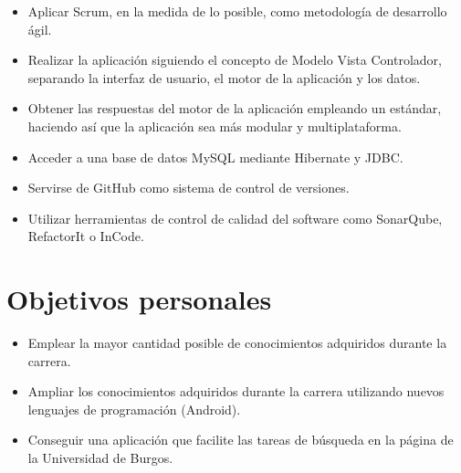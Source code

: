 \begin{itemize}
	\tightlist
	\item
	Aplicar Scrum, en la medida de lo posible, como metodología de desarrollo ágil.
	\item
	Realizar la aplicación siguiendo el concepto de Modelo Vista Controlador, separando la interfaz de usuario, el motor de la aplicación y los datos.
	\item
	Obtener las respuestas del motor de la aplicación empleando un estándar, haciendo así que la aplicación sea más modular y multiplataforma.
	\item
	Acceder a una base de datos MySQL mediante Hibernate y JDBC.
	\item
	Servirse de GitHub como sistema de control de versiones.
	\item
	Utilizar herramientas de control de calidad del software como SonarQube, RefactorIt o InCode.
	
\end{itemize}

\section{Objetivos personales}\label{objetivos-personales}

\begin{itemize}
	\tightlist
	\item
	Emplear la mayor cantidad posible de conocimientos adquiridos durante la carrera.
	\item
	Ampliar los conocimientos adquiridos durante la carrera utilizando nuevos lenguajes de programación (Android).
	\item 
	Conseguir una aplicación que facilite las tareas de búsqueda en la página de la Universidad de Burgos.
\end{itemize}
